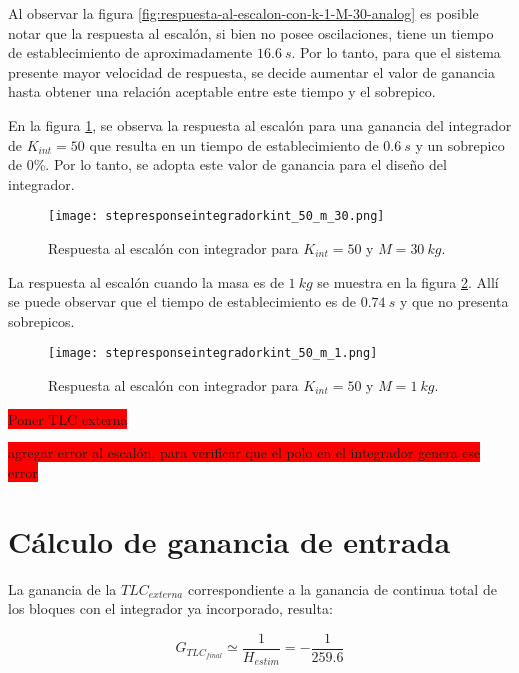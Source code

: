 Al observar la figura \ref{fig:respuesta-al-escalon-con-k-1-M-30-analog} es posible notar que la respuesta al escalón, si bien no posee oscilaciones, tiene un tiempo de establecimiento de aproximadamente $16.6 \:s$. Por lo tanto, para que el sistema presente mayor velocidad de respuesta, se decide aumentar el valor de ganancia hasta obtener una relación aceptable entre este tiempo y el sobrepico.



\noindent En la figura \ref{fig:respuesta-al-escalon-con-k-50-M-30}, se observa la respuesta al escalón para una ganancia del integrador de $K_{int}=50$ que resulta en un tiempo de establecimiento de $0.6\:s$ y un sobrepico de 0\%. Por lo tanto, se adopta este valor de ganancia para el diseño del integrador.

\begin{figure}[H]
	\centering
	\texttt{[image: stepresponseintegradorkint\_50\_m\_30.png]}
	\caption{Respuesta al escalón con integrador para $K_{int}=50$ y $M = 30\:kg$.}
	\label{fig:respuesta-al-escalon-con-k-50-M-30}
\end{figure}

\noindent La respuesta al escal\'{o}n cuando la masa es de $1 \:kg$ se muestra en la figura \ref{fig:respuesta-al-escalon-con-k-50-M-1}. All\'{i} se puede observar que el tiempo de establecimiento es de $0.74\:s$ y que no presenta sobrepicos.

\begin{figure}[H]
	\centering
	\texttt{[image: stepresponseintegradorkint\_50\_m\_1.png]}
	\caption{Respuesta al escalón con integrador para $K_{int} =50$ y $M = 1 \:kg$.}
	\label{fig:respuesta-al-escalon-con-k-50-M-1}
\end{figure}



\colorbox{red}{Poner TLC externa}

\colorbox{red}{agregar error al escalón, para verificar que el polo en el integrador genera ese error}

\section{Cálculo de ganancia de entrada}

\noindent La ganancia de la $TLC_{externa}$ correspondiente a la ganancia de continua total de los bloques con el integrador ya incorporado, resulta:

\begin{equation} 
	G_{TLC_{final}} \simeq \frac{1}{H_{estim}} = - \frac{1}{259.6}
\end{equation}


